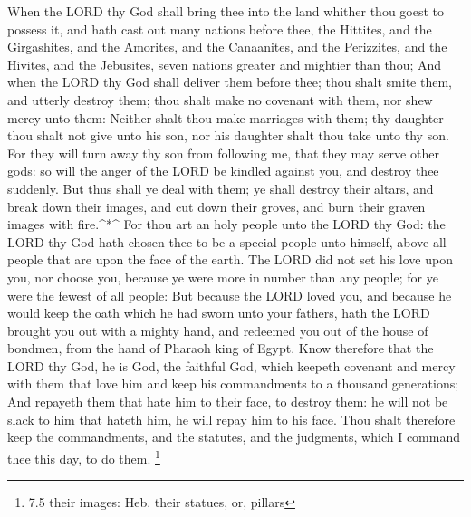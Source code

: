  When the LORD thy God shall bring thee into the land
whither thou goest to possess it, and hath cast out many nations before
thee, the Hittites, and the Girgashites, and the Amorites, and the
Canaanites, and the Perizzites, and the Hivites, and the Jebusites,
seven nations greater and mightier than thou;  And when the
LORD thy God shall deliver them before thee; thou shalt smite them, and
utterly destroy them; thou shalt make no covenant with them, nor shew
mercy unto them:  Neither shalt thou make marriages with
them; thy daughter thou shalt not give unto his son, nor his daughter
shalt thou take unto thy son.  For they will turn away thy
son from following me, that they may serve other gods: so will the anger
of the LORD be kindled against you, and destroy thee suddenly.
 But thus shall ye deal with them; ye shall destroy their
altars, and break down their images, and cut down their groves, and burn
their graven images with fire.\^{}*\^{}  For thou art an
holy people unto the LORD thy God: the LORD thy God hath chosen thee to
be a special people unto himself, above all people that are upon the
face of the earth.  The LORD did not set his love upon you,
nor choose you, because ye were more in number than any people; for ye
were the fewest of all people:  But because the LORD loved
you, and because he would keep the oath which he had sworn unto your
fathers, hath the LORD brought you out with a mighty hand, and redeemed
you out of the house of bondmen, from the hand of Pharaoh king of Egypt.
 Know therefore that the LORD thy God, he is God, the
faithful God, which keepeth covenant and mercy with them that love him
and keep his commandments to a thousand generations;  And
repayeth them that hate him to their face, to destroy them: he will not
be slack to him that hateth him, he will repay him to his face.
 Thou shalt therefore keep the commandments, and the
statutes, and the judgments, which I command thee this day, to do them.
\footnote{7.5 their images: Heb. their statues, or, pillars}


